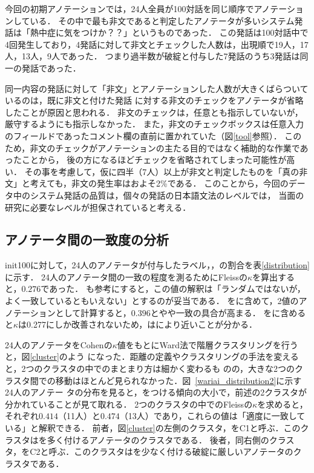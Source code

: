 \documentclass[japanese]{jnlp_1.4}
\newcommand{\maru}{}
\newcommand{\batsu}{}
\newcommand{\sankaku}{}
\begin{document}
今回の初期アノテーションでは，24人全員が100対話を同じ順序でアノテーションしている．
その中で最も非文であると判定したアノテータが多いシステム発話は「熱中症に気をつけか？？」というものであった．
この発話は100対話中で4回発生しており，4発話に対して非文とチェックした人数は，出現順で19人，17人，13人，9人であった．
つまり過半数が破綻と付与した7発話のうち3発話は同一の発話であった．

同一内容の発話に対して「非文」とアノテーションした人数が大きくばらついているのは，既に非文と付けた発話
に対する非文のチェックをアノテータが省略したことが原因と思われる．
非文のチェックは，任意とも指示していないが，厳守するようにも指示しなかった．
また，非文のチェックボックスは任意入力のフィールドであったコメント欄の直前に置かれていた（図\ref{tool}参照）．
このため，非文のチェックがアノテーションの主たる目的ではなく補助的な作業であったことから，
後の方になるほどチェックを省略されてしまった可能性が高い．
その事を考慮して，仮に四半（7人）以上が非文と判定したものを「真の非文」と考えても，非文の発生率はおよそ2\%である．
このことから，今回のデータ中のシステム発話の品質は，個々の発話の日本語文法のレベルでは，
当面の研究に必要なレベルが担保されていると考える．


\subsection{アノテータ間の一致度の分析}

init100に対して，24人のアノテータが付与したラベル\maru，\sankaku ，\batsu の割合を表\ref{distribution}に示す．
24人のアノテータ間の一致の程度を測るためにFleissの$\kappa$を算出すると，$0.276$であった．
\cite{Landis77}も参考にすると，この値の解釈は「ランダムではないが，よく一致しているともいえない」とするのが妥当である．
\sankaku を\batsu に含めて，2値のアノテーションとして計算すると，$0.396$とやや一致の具合が高まる．
\sankaku を\maru に含めると$\kappa$は0.277にしか改善されないため，\sankaku は\batsu により近いことが分かる．

\begin{table}[b]
\caption{init100中の\maru \sankaku \batsu の発生割合（発生数）}
\label{distribution}

\end{table}

24人のアノテータをCohenの$\kappa$値をもとにWard法で階層クラスタリングを行うと，図\ref{cluster}のよう
になった．距離の定義やクラスタリングの手法を変えると，2つのクラスタの中でのまとまり方は細かく変わるも
のの，大きな2つのクラスタ間での移動はほとんど見られなかった．図~\ref{wariai_distribution2}に示す24人のアノテー
タの分布を見ると，\maru をつける傾向の大小で，前述の2クラスタが分かれていることが見て取れる．
2つのクラスタの中でのFleissの$\kappa$を求めると，
それぞれ$0.414$（11人）と$0.474$（13人）であり，これらの値は「適度に一致している」と解釈できる．
前者，図\ref{cluster}の左側のクラスタ，をC1と呼ぶ．このクラスタは\maru を多く付けるアノテータのクラスタである．
後者，同右側のクラスタ，をC2と呼ぶ．このクラスタは\maru を少なく付ける破綻に厳しいアノテータのクラスタである．
\end{document}
